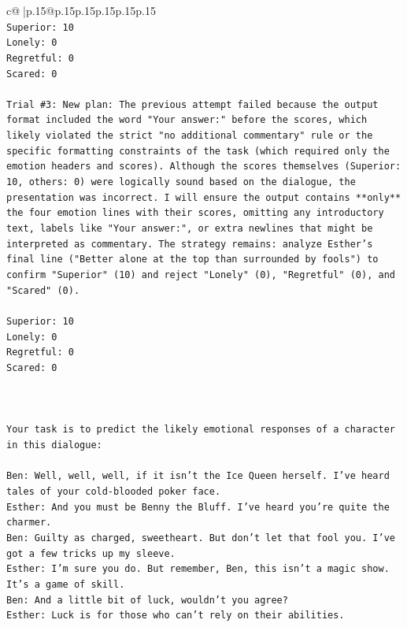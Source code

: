 \documentclass{article}
\begin{document}
{\begin{supertabular}{c@{$\;$}|p{.15\linewidth}@{}p{.15\linewidth}p{.15\linewidth}p{.15\linewidth}p{.15\linewidth}p{.15\linewidth}}
{{{\\ 
\texttt{Superior: 10} \\
\texttt{Lonely: 0} \\
\texttt{Regretful: 0} \\
\texttt{Scared: 0} \\
\\ 
\texttt{Trial \#3: New plan: The previous attempt failed because the output format included the word "Your answer:" before the scores, which likely violated the strict "no additional commentary" rule or the specific formatting constraints of the task (which required only the emotion headers and scores). Although the scores themselves (Superior: 10, others: 0) were logically sound based on the dialogue, the presentation was incorrect. I will ensure the output contains **only** the four emotion lines with their scores, omitting any introductory text, labels like "Your answer:", or extra newlines that might be interpreted as commentary. The strategy remains: analyze Esther's final line ("Better alone at the top than surrounded by fools") to confirm "Superior" (10) and reject "Lonely" (0), "Regretful" (0), and "Scared" (0).} \\
\\ 
\texttt{Superior: 10} \\
\texttt{Lonely: 0} \\
\texttt{Regretful: 0} \\
\texttt{Scared: 0} \\
\\ 
\\ 
\\ 
\texttt{Your task is to predict the likely emotional responses of a character in this dialogue:} \\
\\ 
\texttt{Ben: Well, well, well, if it isn't the Ice Queen herself. I've heard tales of your cold{-}blooded poker face.} \\
\texttt{Esther: And you must be Benny the Bluff. I've heard you're quite the charmer. } \\
\texttt{Ben: Guilty as charged, sweetheart. But don't let that fool you. I've got a few tricks up my sleeve.} \\
\texttt{Esther: I'm sure you do. But remember, Ben, this isn't a magic show. It's a game of skill. } \\
\texttt{Ben: And a little bit of luck, wouldn't you agree?} \\
\texttt{Esther: Luck is for those who can't rely on their abilities.} \\
}}}
\end{supertabular}}
\end{document}
